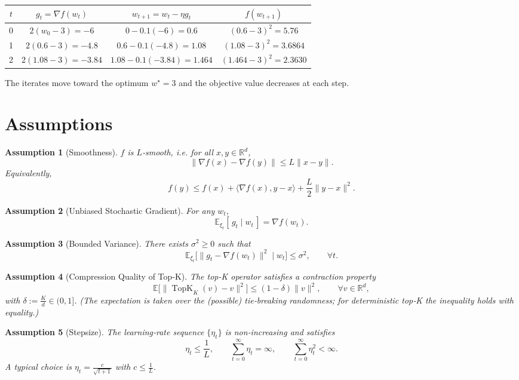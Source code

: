 \documentclass{article}
\newtheorem{assumption}{Assumption}
\newcommand{\TopK}[2]{\operatorname{TopK}_{#1}(#2)} %
\begin{document}
\begin{center}
\begin{tabular}{c|c|c|c}
$t$ & $g_t=\nabla f(w_t)$ & $w_{t+1}=w_t-\eta g_t$ & $f(w_{t+1})$\\\hline
0 & $2(w_0-3)=-6$ & $0-0.1(-6)=0.6$ & $(0.6-3)^2=5.76$\\
1 & $2(0.6-3)=-4.8$ & $0.6-0.1(-4.8)=1.08$ & $(1.08-3)^2=3.6864$\\
2 & $2(1.08-3)=-3.84$ & $1.08-0.1(-3.84)=1.464$ & $(1.464-3)^2=2.3630$\\
\end{tabular}
\end{center}
The iterates move toward the optimum $w^\star=3$ and the objective value decreases at each step.

\newpage
\section*{Assumptions}
\begin{assumption}[Smoothness]\label{as:smooth}
$f$ is $L$‑smooth, i.e. for all $x,y\in\mathbb{R}^d$,
\[
\|\nabla f(x)-\nabla f(y)\|\le L\|x-y\|.
\tag{A1}
\]
Equivalently,
\[
f(y)\le f(x)+\langle\nabla f(x),y-x\rangle+\frac{L}{2}\|y-x\|^2.
\tag{A1'}
\]
\end{assumption}

\begin{assumption}[Unbiased Stochastic Gradient]\label{as:unbiased}
For any $w_t$,
\[
\mathbb{E}_{\xi_t}[\,g_t\mid w_t\,]=\nabla f(w_t).
\tag{A2}
\]
\end{assumption}

\begin{assumption}[Bounded Variance]\label{as:variance}
There exists $\sigma^2\ge0$ such that
\[
\mathbb{E}_{\xi_t}\big[\|g_t-\nabla f(w_t)\|^2\mid w_t\big]\le\sigma^2,
\qquad\forall t.
\tag{A3}
\]
\end{assumption}

\begin{assumption}[Compression Quality of Top‑K]\label{as:compress}
The top‑K operator satisfies a \emph{contraction} property
\[
\mathbb{E}\big[\|\TopK{K}{v}-v\|^2\big]\le (1-\delta)\|v\|^2,
\qquad\forall v\in\mathbb{R}^d,
\tag{A4}
\]
with $\delta:=\frac{K}{d}\in(0,1]$.  
(The expectation is taken over the (possible) tie‑breaking randomness; for deterministic top‑K the inequality holds with equality.)
\end{assumption}

\begin{assumption}[Stepsize]\label{as:stepsize}
The learning‑rate sequence $\{\eta_t\}$ is non‑increasing and satisfies
\[
\eta_t\le\frac{1}{L},\qquad
\sum_{t=0}^{\infty}\eta_t =\infty,\qquad
\sum_{t=0}^{\infty}\eta_t^{2}<\infty .
\tag{A5}
\]
A typical choice is $\eta_t=\frac{c}{\sqrt{t+1}}$ with $c\le\frac{1}{L}$.
\end{assumption}
\end{document}
